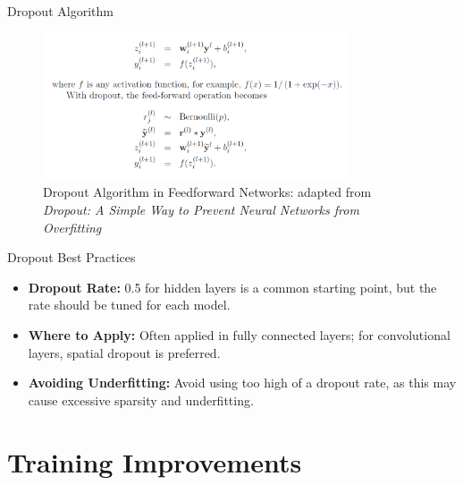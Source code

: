 \documentclass[serif, aspectratio=169]{beamer}
\begin{document}
\begin{frame}{Dropout Algorithm}
    \begin{figure}
                \includegraphics[width=0.8\textwidth]{pic/dropout/algorithm.png}
                \caption{Dropout Algorithm in Feedforward Networks: adapted from \textit{Dropout: A Simple Way to Prevent Neural Networks from Overfitting}}
                \label{fig:Dropout}
            \end{figure}
\end{frame}



\begin{frame}{Dropout Best Practices}
    \begin{itemize}
        \item \textbf{Dropout Rate:} 0.5 for hidden layers is a common starting point, but the rate should be tuned for each model.
        \item \textbf{Where to Apply:} Often applied in fully connected layers; for convolutional layers, spatial dropout is preferred.
        \item \textbf{Avoiding Underfitting:} Avoid using too high of a dropout rate, as this may cause excessive sparsity and underfitting.
    \end{itemize}
\end{frame}




\section{Training Improvements}

\end{document}
